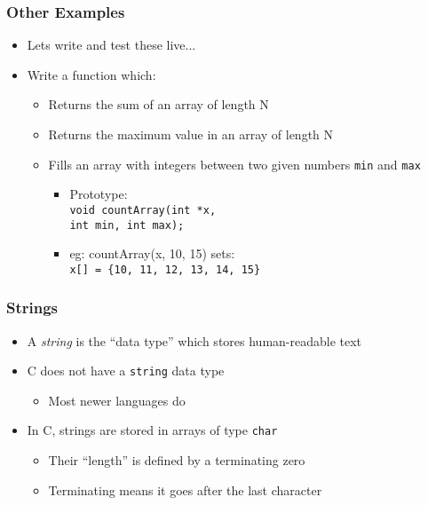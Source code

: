 \documentclass[14pt]{beamer}
\begin{document}
\begin{frame}
\frametitle{Other Examples}
\begin{itemize}
\item Lets write and test these live...
\item Write a function which:
	\begin{itemize}	
		\item Returns the sum of an array of length N
		\item Returns the maximum value in an array of length N
		\item Fills an array with integers between two given numbers \texttt{min} and \texttt{max}
			\begin{itemize}
				\item Prototype:\\\texttt{void countArray(int *x,\\\quad \quad \quad \quad int min, int max);}
				\item eg: countArray(x, 10, 15) sets:\\ \texttt{x[] = \{10, 11, 12, 13, 14, 15\}}
			\end{itemize}
	\end{itemize}
\end{itemize}
\end{frame}

\begin{frame}
\frametitle{Strings}
\begin{itemize}
\item A \textit{string} is the ``data type'' which stores human-readable text
\item C does not have a \texttt{string} data type
	\begin{itemize}
		\item Most newer languages do
	\end{itemize}
\item In C, strings are stored in arrays of type \texttt{char}
	\begin{itemize}
		\item Their ``length'' is defined by a terminating zero
		\item Terminating means it goes after the last character
	\end{itemize}
\end{itemize}
\end{frame}
\end{document}
